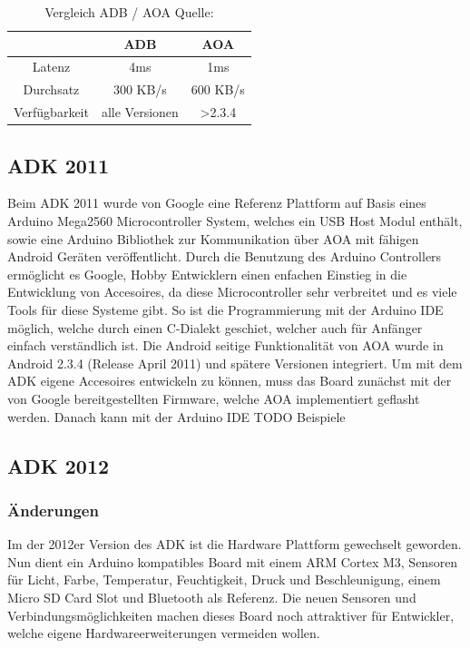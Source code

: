 \documentclass[12pt,journal,compsoc]{IEEEtran}
\begin{document}
\begin{table}
	\centering
	\caption{Vergleich ADB / AOA Quelle: \cite{comp}}
	\label{table:vergl}
	\begin{tabular}{c | c | c}
		& ADB & AOA \\ \hline
		Latenz & 4ms & 1ms \\ \hline
		Durchsatz & 300 KB/s & 600 KB/s \\ \hline
		Verfügbarkeit & alle Versionen & \textgreater 2.3.4 \\ \hline
	\end{tabular}
\end{table}


\subsection{ADK 2011}
Beim ADK 2011 wurde von Google eine
Referenz Plattform auf Basis eines Arduino Mega2560 Microcontroller System, welches ein USB Host Modul enthält, sowie eine Arduino Bibliothek zur Kommunikation über AOA mit fähigen Android Geräten veröffentlicht.
Durch die Benutzung des Arduino Controllers ermöglicht es Google, Hobby Entwicklern einen enfachen Einstieg in die Entwicklung von Accesoires, da diese Microcontroller sehr verbreitet und es viele Tools für diese Systeme gibt.
So ist die Programmierung mit der Arduino IDE möglich, welche durch einen C-Dialekt geschiet, welcher auch für Anfänger einfach verständlich ist.
Die Android seitige Funktionalität von AOA wurde in Android 2.3.4 (Release April 2011) und spätere Versionen integriert. 
Um mit dem ADK eigene Accesoires entwickeln zu können, muss das Board zunächst mit der von Google bereitgestellten Firmware, welche AOA implementiert geflasht werden.
Danach kann mit der Arduino IDE 
TODO Beispiele
\subsection{ADK 2012}
\subsubsection{Änderungen}
Im der 2012er Version des ADK ist die Hardware Plattform gewechselt geworden. Nun dient ein Arduino kompatibles Board mit einem ARM Cortex M3, Sensoren für Licht, Farbe, Temperatur, Feuchtigkeit, Druck und Beschleunigung, einem Micro SD Card Slot und Bluetooth als Referenz.
Die neuen Sensoren und Verbindungsmöglichkeiten machen dieses Board noch attraktiver für Entwickler, welche eigene Hardwareerweiterungen vermeiden wollen.
\end{document}
